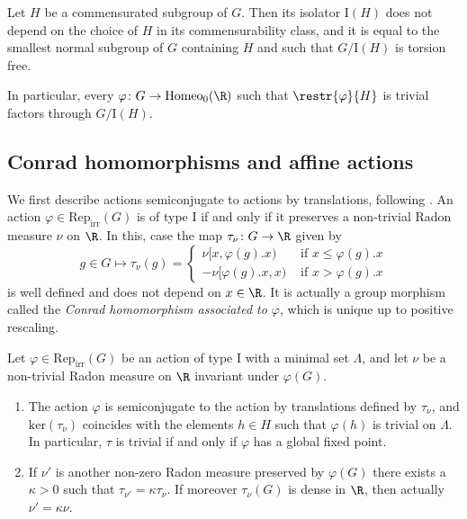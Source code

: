 \documentclass[reqno]{amsart}
\begin{document}
\begin{lema} \label{lema:isolator}
    Let $H$ be a commensurated subgroup of $G$. Then its isolator $\mathrm{I}(H)$ does not depend on the choice of $H$ in its commensurability class, and it is equal to the smallest normal subgroup of $G$ containing $H$ and such that $G/\mathrm{I}(H)$ is torsion free.
    
    In particular, every $\varphi\colon G
    \to \mathrm{Homeo_0(\R)}$ such that $\restr{\varphi}{H}$ is trivial factors through $G/\mathrm{I}(H)$.
    
    
    
\end{lema}






\subsection{Conrad homomorphisms and affine actions} \label{subsection:conrad}
We first describe actions semiconjugate to actions by translations, following \cite[Section 2.2]{Navas2011}. An action $\varphi \in \mathrm{Rep}_\mathrm{irr}(G)$ is of type I if and only if it preserves a non-trivial Radon measure $\nu$ on $\R$. In this, case the map $\tau_\nu \colon G \to \R$ given by
            \begin{equation} \label{eq:defTau}
                g \in G \mapsto \tau_\nu(g) = 
                \begin{cases}
                        \nu[x,\varphi(g).x) & \text{ if } x \leq \varphi(g).x\\
                        -\nu[\varphi(g).x, x) & \text{ if } x > \varphi(g).x
                \end{cases}
        \end{equation}
is well defined and does not depend on $x \in \R$. It is actually a group morphism called the \emph{Conrad homomorphism associated to $\varphi$}, which is unique up to positive rescaling.

\begin{prop}\label{prop:conrad} 
        Let $\varphi \in \mathrm{Rep}_\mathrm{irr}(G)$ be an action of type I with a minimal set $\Lambda$, and let $\nu$ be a non-trivial Radon measure on $\R$ invariant under $\varphi(G)$.
\begin{enumerate}
        \item \label{itC:3} The action $\varphi$ is semiconjugate to the action by translations defined by $\tau_\nu$, and $\mathrm{ker}(\tau_\nu)$ coincides with the elements $h \in H$ such that $\varphi(h)$ is trivial on $\Lambda$. In particular, $\tau$ is trivial if and only if $\varphi$ has a global fixed point.
        \item \label{itC:4} If $\nu'$ is another non-zero Radon measure preserved by $\varphi(G)$ there exists a $\kappa > 0$ such that $\tau_{\nu'} = \kappa \tau_\nu$. If moreover $\tau_\nu(G)$ is dense in $\R$, then actually $\nu' = \kappa \nu$.
\end{enumerate}
\end{prop}
\end{document}
